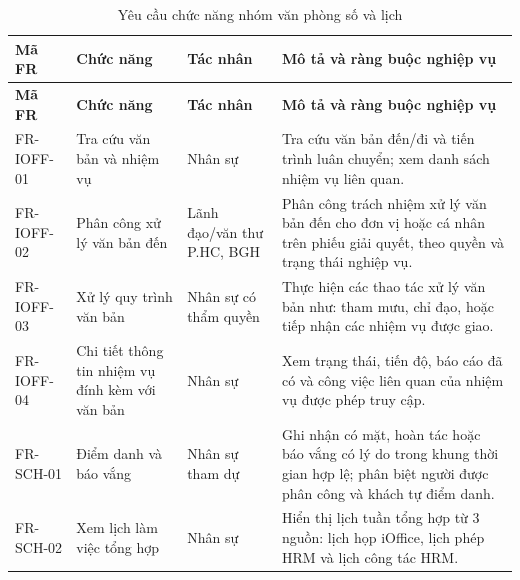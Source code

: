 \begin{xltabular}{\textwidth}{|L{1.8cm}|L{3.5cm}|L{2.5cm}|Y|}
\caption{Yêu cầu chức năng nhóm văn phòng số và lịch}\label{tab:fr_ioffice_schedule}\\\hline
\textbf{Mã FR} & \textbf{Chức năng} & \textbf{Tác nhân} & \textbf{Mô tả và ràng buộc nghiệp vụ} \\\hline
\endfirsthead\hline
\textbf{Mã FR} & \textbf{Chức năng} & \textbf{Tác nhân} & \textbf{Mô tả và ràng buộc nghiệp vụ} \\\hline
\endhead
        FR-IOFF-01     & Tra cứu văn bản và nhiệm vụ                      & Nhân sự                     & Tra cứu văn bản đến/đi và tiến trình luân chuyển; xem danh sách nhiệm vụ liên quan.                   \\
        \hline
        FR-IOFF-02     & Phân công xử lý văn bản đến                            & Lãnh đạo/văn thư P.HC, BGH & Phân công trách nhiệm xử lý văn bản đến cho đơn vị hoặc cá nhân trên phiếu giải quyết, theo quyền và trạng thái nghiệp vụ.                      \\
        \hline
        FR-IOFF-03     & Xử lý quy trình văn bản                          & Nhân sự có thẩm quyền       & Thực hiện các thao tác xử lý văn bản như: tham mưu, chỉ đạo, hoặc tiếp nhận các nhiệm vụ được giao.             \\
        \hline
        FR-IOFF-04     & Chi tiết thông tin nhiệm vụ đính kèm với văn bản & Nhân sự                     & Xem trạng thái, tiến độ, báo cáo đã có và công việc liên quan của nhiệm vụ được phép truy cập. \\
        \hline
        FR-SCH-01      & Điểm danh và báo vắng                            & Nhân sự tham dự             & Ghi nhận có mặt, hoàn tác hoặc báo vắng có lý do trong khung thời gian hợp lệ; phân biệt người được phân công và khách tự điểm danh. \\
        \hline
        FR-SCH-02      & Xem lịch làm việc tổng hợp                       & Nhân sự         & Hiển thị lịch tuần tổng hợp từ 3 nguồn: lịch họp iOffice, lịch phép HRM và lịch công tác HRM.                   \\
        \hline


\end{xltabular}
